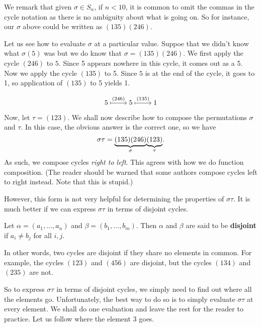 \documentclass[./main.tex]{subfiles}
\begin{document}
We remark that given $\sigma \in S_n$, if $n < 10$, it is common to omit the
commas in the cycle notation as there is no ambiguity about what is going on. So
for instance, our $\sigma$ above could be written as $(135)(246)$.

Let us see how to evaluate $\sigma$ at a particular value. Suppoe that we didn't
know what $\sigma(5)$ was but we do know that $\sigma = (135)(246)$. We first
apply the cycle $(246)$ to $5$. Since 5 appears nowhere in this cycle, it comes
out as a 5. Now we apply the cycle $(135)$ to 5. Since $5$ is at the end of the
cycle, it goes to 1, so application of $(135)$ to 5 yields 1.

\[\begin{tikzcd}[cramped]
	5 & 5 & 1
	\arrow["{(246)}", maps to, from=1-1, to=1-2]
	\arrow["{(135)}", maps to, from=1-2, to=1-3]
\end{tikzcd}\]



Now, let $\tau = (123)$. We shall now describe how to compose the permutations
$\sigma$ and $\tau$. In this case, the obvious answer is the correct one,
so we have
\[
    \sigma \tau = {\underbrace{(135)(246)}_{\text{$\sigma$}}} {\underbrace{(123)}_{\text{$\tau$}}}.
\]
As such, we compose cycles \emph{right to left}. This agrees with how we do
function composition. (The reader should be warned that some authors compose
cycles left to right instead. Note that this is stupid.)

However, this form is not very helpful for determining the properties of
$\sigma\tau$. It is much better if we can express $\sigma \tau$ in terms of
disjoint cycles.

\begin{definition}
    Let $\alpha = (a_1, \dots, a_n)$ and $\beta = (b_1, \dots, b_m)$. Then
    $\alpha$ and $\beta$ are said to be \textbf{disjoint} if $a_i \neq b_j$ for
    all $i, j$.
\end{definition}
In other words, two cycles are disjoint if they share no elements in common. For
example, the cycles $(123)$ and $(456)$ are disjoint, but the cycles $(134)$ and
$(235)$ are not.

So to express $\sigma \tau$ in terms of disjoint cycles, we simply need to find
out where all the elements go. Unfortunately, the best way to do so is to simply
evaluate $\sigma \tau$ at every element. We shall do one evaluation and leave
the rest for the reader to practice. Let us follow where the element 3 goes. 
\end{document}
